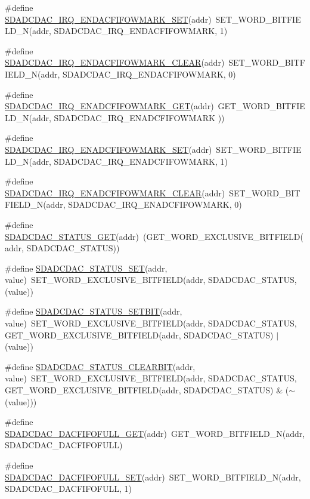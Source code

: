 \begin{DoxyCompactItemize}
\item 
\#define \hyperlink{a00568_a25754791a57b26415c132d2f3f017c8f}{SDADCDAC\_\-IRQ\_\-ENDACFIFOWMARK\_\-SET}(addr)~SET\_\-WORD\_\-BITFIELD\_\-N(addr, SDADCDAC\_\-IRQ\_\-ENDACFIFOWMARK, 1)
\item 
\#define \hyperlink{a00568_a2507b7b519c515a66323a2fc77954c4a}{SDADCDAC\_\-IRQ\_\-ENDACFIFOWMARK\_\-CLEAR}(addr)~SET\_\-WORD\_\-BITFIELD\_\-N(addr, SDADCDAC\_\-IRQ\_\-ENDACFIFOWMARK, 0)
\item 
\#define \hyperlink{a00568_ab71faa7e7ec4b3a1a97feca78d5b7a94}{SDADCDAC\_\-IRQ\_\-ENADCFIFOWMARK\_\-GET}(addr)~GET\_\-WORD\_\-BITFIELD\_\-N(addr, SDADCDAC\_\-IRQ\_\-ENADCFIFOWMARK ))
\item 
\#define \hyperlink{a00568_a67782369b678daa856c04a9c34c79cee}{SDADCDAC\_\-IRQ\_\-ENADCFIFOWMARK\_\-SET}(addr)~SET\_\-WORD\_\-BITFIELD\_\-N(addr, SDADCDAC\_\-IRQ\_\-ENADCFIFOWMARK, 1)
\item 
\#define \hyperlink{a00568_a44ae40ed2b23e1103b4cf545ffdc33c7}{SDADCDAC\_\-IRQ\_\-ENADCFIFOWMARK\_\-CLEAR}(addr)~SET\_\-WORD\_\-BITFIELD\_\-N(addr, SDADCDAC\_\-IRQ\_\-ENADCFIFOWMARK, 0)
\item 
\#define \hyperlink{a00568_a5f09a80c88714661ab9a6b4e342aaaed}{SDADCDAC\_\-STATUS\_\-GET}(addr)~(GET\_\-WORD\_\-EXCLUSIVE\_\-BITFIELD(addr, SDADCDAC\_\-STATUS))
\item 
\#define \hyperlink{a00568_ae68c414804ff0419aa5c0abfbe46d875}{SDADCDAC\_\-STATUS\_\-SET}(addr, value)~SET\_\-WORD\_\-EXCLUSIVE\_\-BITFIELD(addr, SDADCDAC\_\-STATUS, (value))
\item 
\#define \hyperlink{a00568_a75ee53ca94389184dadeea7674440e5e}{SDADCDAC\_\-STATUS\_\-SETBIT}(addr, value)~SET\_\-WORD\_\-EXCLUSIVE\_\-BITFIELD(addr, SDADCDAC\_\-STATUS, GET\_\-WORD\_\-EXCLUSIVE\_\-BITFIELD(addr, SDADCDAC\_\-STATUS) $|$ (value))
\item 
\#define \hyperlink{a00568_a50c5087d2ba0add96ed9049be025c634}{SDADCDAC\_\-STATUS\_\-CLEARBIT}(addr, value)~SET\_\-WORD\_\-EXCLUSIVE\_\-BITFIELD(addr, SDADCDAC\_\-STATUS, GET\_\-WORD\_\-EXCLUSIVE\_\-BITFIELD(addr, SDADCDAC\_\-STATUS) \& ($\sim$(value)))
\item 
\#define \hyperlink{a00568_adeb87c98ac71668f33d229e616183b1c}{SDADCDAC\_\-DACFIFOFULL\_\-GET}(addr)~GET\_\-WORD\_\-BITFIELD\_\-N(addr, SDADCDAC\_\-DACFIFOFULL)
\item 
\#define \hyperlink{a00568_a5215d199d5e3b1b9b754e4a9f82c707d}{SDADCDAC\_\-DACFIFOFULL\_\-SET}(addr)~SET\_\-WORD\_\-BITFIELD\_\-N(addr, SDADCDAC\_\-DACFIFOFULL, 1)
\item 

\end{DoxyCompactItemize}
